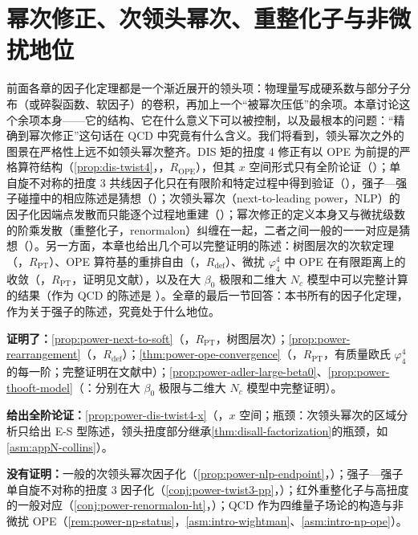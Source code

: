 \chapter{幂次修正、次领头幂次、重整化子与非微扰地位}\label{ch:power}

前面各章的因子化定理都是一个渐近展开的领头项：物理量写成硬系数与部分子分布（或碎裂函数、软因子）的卷积，再加上一个“被幂次压低”的余项。本章讨论这个余项本身——它的结构、它在什么意义下可以被控制，以及最根本的问题：“精确到幂次修正”这句话在 QCD 中究竟有什么含义。我们将看到，领头幂次之外的图景在严格性上远不如领头幂次整齐。DIS 矩的扭度 4 修正有以 OPE 为前提的严格算符结构（\cref{prop:dis-twist4}，\tagR，$R_{\mathrm{OPE}}$），但其 $x$ 空间形式只有全阶论证（\tagA）；单自旋不对称的扭度 3 共线因子化只在有限阶和特定过程中得到验证（\tagP），强子—强子碰撞中的相应陈述是猜想（\tagC）；次领头幂次（next-to-leading power，NLP）的因子化因端点发散而只能逐个过程地重建（\tagP）；幂次修正的定义本身又与微扰级数的阶乘发散（重整化子，renormalon）纠缠在一起，二者之间一般的一一对应是猜想（\tagC）。另一方面，本章也给出几个可以完整证明的陈述：树图层次的次软定理（\tagR，$R_{\mathrm{PT}}$）、OPE 算符基的重排自由（\tagR，$R_{\mathrm{def}}$）、微扰 $\varphi^4_4$ 中 OPE 在有限距离上的收敛（\tagR，$R_{\mathrm{PT}}$，证明见文献），以及在大 $\beta_0$ 极限和二维大 $N_c$ 模型中可以完整计算的结果（作为 QCD 的陈述是 \tagP）。全章的最后一节回答：本书所有的因子化定理，作为关于强子的陈述，究竟处于什么地位。

\begin{tcolorbox}[enhanced,breakable,title=本章证明了什么／没有证明什么,fonttitle=\bfseries,
  colback=gray!3!white,colframe=gray!55!black,boxrule=0.6pt,arc=2pt,
  left=5pt,right=5pt,top=3pt,bottom=3pt,before skip=6pt,after skip=6pt]
\textbf{证明了：}\cref{prop:power-next-to-soft}（\tagR，$R_{\mathrm{PT}}$，树图层次）；\cref{prop:power-rearrangement}（\tagR，$R_{\mathrm{def}}$）；\cref{thm:power-ope-convergence}（\tagR，$R_{\mathrm{PT}}$，有质量欧氏 $\varphi^4_4$ 的每一阶；完整证明在文献中）；\cref{prop:power-adler-large-beta0}、\cref{prop:power-thooft-model}（\tagP：分别在大 $\beta_0$ 极限与二维大 $N_c$ 模型中完整证明）。\par
\textbf{给出全阶论证：}\cref{prop:power-dis-twist4-x}（\tagA，$x$ 空间；瓶颈：次领头幂次的区域分析只给出 E-S 型陈述，领头扭度部分继承\cref{thm:disall-factorization}的瓶颈，如 \cref{asm:appN-collins}）。\par
\textbf{没有证明：}一般的次领头幂次因子化（\cref{prop:power-nlp-endpoint}，\tagP）；强子—强子单自旋不对称的扭度 3 因子化（\cref{conj:power-twist3-pp}，\tagC）；红外重整化子与高扭度的一般对应（\cref{conj:power-renormalon-ht}，\tagC）；QCD 作为四维量子场论的构造与非微扰 OPE（\cref{rem:power-np-status}，\cref{asm:intro-wightman}、\cref{asm:intro-np-ope}）。
\end{tcolorbox}

